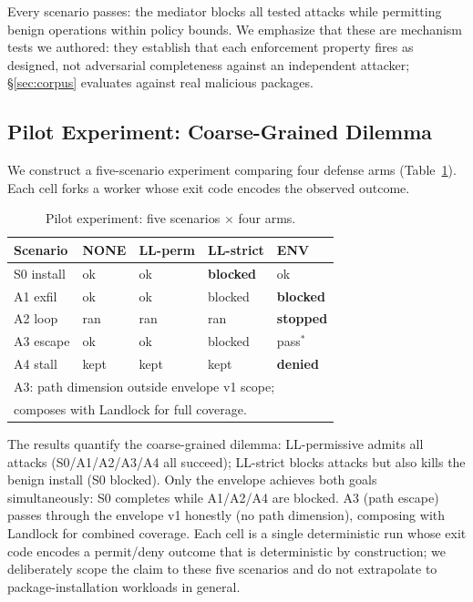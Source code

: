 \documentclass[letterpaper,twocolumn,10pt]{article}
\begin{document}
Every scenario passes: the mediator blocks all tested attacks while
permitting benign operations within policy bounds.  We emphasize that
these are mechanism tests we authored: they establish that each
enforcement property fires as designed, not adversarial completeness
against an independent attacker; \S\ref{sec:corpus} evaluates against
real malicious packages.

\subsection{Pilot Experiment: Coarse-Grained Dilemma}

We construct a five-scenario experiment comparing four defense arms
(Table~\ref{tab:pilot}).  Each cell forks a worker whose exit code
encodes the observed outcome.

\begin{table}[t]
\centering
\caption{Pilot experiment: five scenarios $\times$ four arms.}
\label{tab:pilot}
\small
\begin{tabular}{lp{1.2cm}p{1.2cm}p{1.2cm}p{1.2cm}}
\toprule
\textbf{Scenario} & \textbf{NONE} & \textbf{LL-perm} & \textbf{LL-strict} & \textbf{ENV} \\
\midrule
S0 install & ok & ok & \textbf{blocked} & ok \\
A1 exfil   & ok & ok & blocked & \textbf{blocked} \\
A2 loop    & ran & ran & ran & \textbf{stopped} \\
A3 escape  & ok & ok & blocked & pass$^*$ \\
A4 stall   & kept & kept & kept & \textbf{denied} \\
\bottomrule
\multicolumn{5}{l}{\footnotesize *A3: path dimension outside envelope v1 scope;}\\
\multicolumn{5}{l}{\footnotesize composes with Landlock for full coverage.}\\
\end{tabular}
\end{table}

The results quantify the coarse-grained dilemma: LL-permissive admits
all attacks (S0/A1/A2/A3/A4 all succeed); LL-strict blocks attacks
but also kills the benign install (S0 blocked).  Only the envelope
achieves both goals simultaneously: S0 completes while A1/A2/A4 are
blocked.  A3 (path escape) passes through the envelope v1 honestly
(no path dimension), composing with Landlock for combined coverage.
Each cell is a single deterministic run whose exit code encodes a
permit/deny outcome that is deterministic by construction; we
deliberately scope the claim to these five scenarios and do not
extrapolate to package-installation workloads in general.
\end{document}
